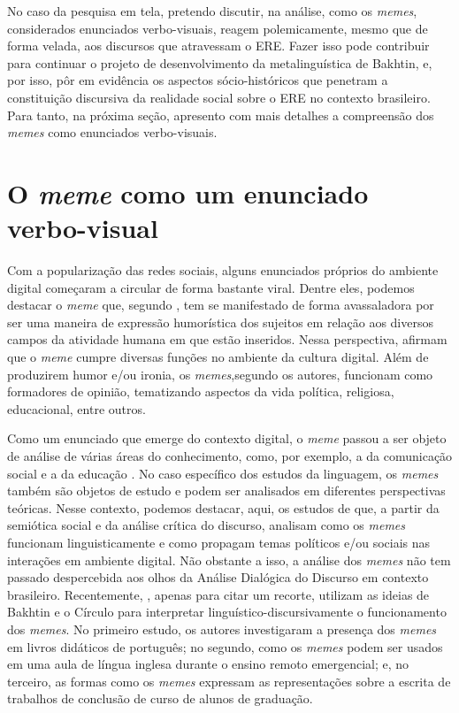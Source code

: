 \documentclass[portuguese]{textolivre}
\begin{document}
No caso da pesquisa em tela, pretendo discutir, na análise, como os \textit{memes}, considerados enunciados verbo-visuais, reagem polemicamente, mesmo que de forma velada, aos discursos que atravessam o ERE. Fazer isso pode contribuir para continuar o projeto de desenvolvimento da metalinguística de Bakhtin, e, por isso, pôr em evidência os aspectos sócio-históricos que penetram a constituição discursiva da realidade social sobre o ERE no contexto brasileiro. Para tanto, na próxima seção, apresento com mais detalhes a compreensão dos \textit{memes} como enunciados verbo-visuais.
	
\section{O \textit{meme} como um enunciado verbo-visual}\label{sec-verbo-visual}
Com a popularização das redes sociais, alguns enunciados próprios do ambiente digital começaram a circular de forma bastante viral. Dentre eles, podemos destacar o \textit{meme} que, segundo \textcite{silva2016memes}, tem se manifestado de forma avassaladora por ser uma maneira de expressão humorística dos sujeitos em relação aos diversos campos da atividade humana em que estão inseridos. Nessa perspectiva, \textcite{Bessa2023} afirmam que o \textit{meme} cumpre diversas funções no ambiente da cultura digital. Além de produzirem humor e/ou ironia, os \textit{memes},segundo os autores, funcionam como formadores de opinião, tematizando aspectos da vida política, religiosa, educacional, entre outros.
	
Como um enunciado que emerge do contexto digital, o \textit{meme} passou a ser objeto de análise de várias áreas do conhecimento, como, por exemplo, a da comunicação social \cite{recuero2008memes} e a da educação \cite{maddalena2020meme}. No caso específico dos estudos da linguagem, os \textit{memes} também são objetos de estudo e podem ser analisados em diferentes perspectivas teóricas. Nesse contexto, podemos destacar, aqui, os estudos de \textcite{souzajunior2015selfienaurna,souzajunior2016lado} que, a partir da semiótica social e da análise crítica do discurso, analisam como os \textit{memes} funcionam linguisticamente e como propagam temas políticos e/ou sociais nas interações em ambiente digital.
Não obstante a isso, a análise dos \textit{memes} não tem passado despercebida aos olhos da Análise Dialógica do Discurso em contexto brasileiro. Recentemente, \textcite{lara2020meme,lima2022reflexao,Bessa2023}, apenas para citar um recorte, utilizam as ideias de Bakhtin e o Círculo para interpretar linguístico-discursivamente o funcionamento dos \textit{memes}. No primeiro estudo, os autores investigaram a presença dos \textit{memes} em livros didáticos de português; no segundo, como os \textit{memes} podem ser usados em uma aula de língua inglesa durante o ensino remoto emergencial; e, no terceiro, as formas como os \textit{memes} expressam as representações sobre a escrita de trabalhos de conclusão de curso de alunos de graduação.
	
\end{document}
